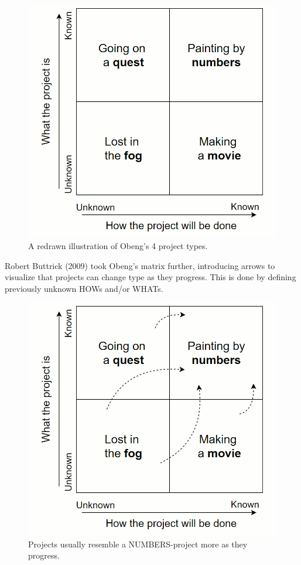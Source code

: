 \begin{figure}[H]
\hspace*{-1cm}
\centering
\includegraphics[scale=0.5]{figure/obeng1.png}
\caption{A redrawn illustration of Obeng's 4 project types.}
\label{obeng1}
\end{figure}

Robert Buttrick (2009) took Obeng's matrix further, introducing arrows to visualize that projects can change type as they progress. This is done by defining previously unknown HOWs and/or WHATs.
\begin{figure}[H]
\hspace*{-1cm}
\centering
\includegraphics[scale=0.35]{figure/obeng2.png}
\caption{Projects usually resemble a NUMBERS-project more as they progress.}
\label{obeng2}
\end{figure}

